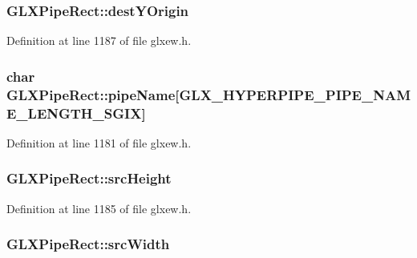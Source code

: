 \hypertarget{struct_g_l_x_pipe_rect_aef7766b02ef07c20a11e89da5878b469}{
\subsubsection[{dest\-Y\-Origin}]{ G\-L\-X\-Pipe\-Rect\-::dest\-Y\-Origin}}\label{struct_g_l_x_pipe_rect_aef7766b02ef07c20a11e89da5878b469}


Definition at line 1187 of file glxew.\-h.

\hypertarget{struct_g_l_x_pipe_rect_aa4c4f60e9647705ddefa10f95a37cb79}{
\subsubsection[{pipe\-Name}]{\setlength{\rightskip}{0pt plus 5cm}char G\-L\-X\-Pipe\-Rect\-::pipe\-Name\mbox{[}{\bf G\-L\-X\-\_\-\-H\-Y\-P\-E\-R\-P\-I\-P\-E\-\_\-\-P\-I\-P\-E\-\_\-\-N\-A\-M\-E\-\_\-\-L\-E\-N\-G\-T\-H\-\_\-\-S\-G\-I\-X}\mbox{]}}}\label{struct_g_l_x_pipe_rect_aa4c4f60e9647705ddefa10f95a37cb79}


Definition at line 1181 of file glxew.\-h.

\hypertarget{struct_g_l_x_pipe_rect_a35632524bce6bffa05f284a9b1c1b8ff}{
\subsubsection[{src\-Height}]{ G\-L\-X\-Pipe\-Rect\-::src\-Height}}\label{struct_g_l_x_pipe_rect_a35632524bce6bffa05f284a9b1c1b8ff}


Definition at line 1185 of file glxew.\-h.

\hypertarget{struct_g_l_x_pipe_rect_a2c6c180a4dabb71076366e06a1c7d0ef}{
\subsubsection[{src\-Width}]{ G\-L\-X\-Pipe\-Rect\-::src\-Width}}\label{struct_g_l_x_pipe_rect_a2c6c180a4dabb71076366e06a1c7d0ef}


